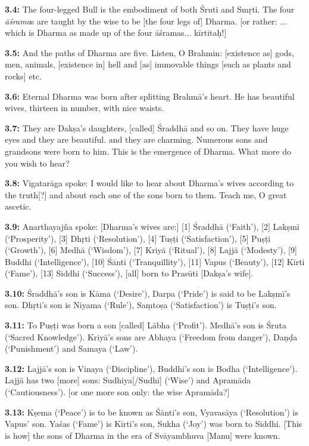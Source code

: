 \documentclass{article}
\newcommand{\vsnum}[1]{\textbf{#1}}
\newcommand{\skt}[1]{\textit{#1}}
\begin{document}
\vsnum{3.4: }The four-legged Bull is the embodiment of both Śruti and Smṛti. The four \skt{āśrama}s are taught by the wise to be [the four legs of] Dharma. [or rather: ... which is Dharma as made up of the four āśramas... kīrtitaḥ!]

\vsnum{3.5: }And the paths of Dharma are five. Listen, O Brahmin: [existence as] gods, men, animals, [existence in] hell and [as] immovable things [such as plants and rocks] etc.

\vsnum{3.6: }Eternal Dharma was born after splitting Brahmā's heart. He has beautiful wives, thirteen in number, with nice waists.

\vsnum{3.7: }They are Dakṣa's daughters, [called] Śraddhā and so on. They have huge eyes and they are beautiful. and they are charming. Numerous sons and grandsons were born to him. This is the emergence of Dharma. What more do you wish to hear?

\vsnum{3.8: }Vigatarāga spoke: I would like to hear about Dharma's wives according to the truth[?] and about each one of the sons born to them. Teach me, O great ascetic.

\vsnum{3.9: }Anarthayajña spoke: [Dharma's wives are:] [1] Śraddhā (`Faith'), [2] Lakṣmī (`Prosperity'), [3] Dhṛti (`Resolution'), [4] Tuṣṭi (`Satisfaction'), [5] Puṣṭi (`Growth'), [6] Medhā (`Wisdom'), [7] Kriyā (`Ritual'), [8] Lajjā (`Modesty'), [9] Buddhi (`Intelligence'), [10] Śānti (`Tranquillity'), [11] Vapus (`Beauty'), [12] Kīrti (`Fame'), [13] Siddhi (`Success'), [all] born to Prasūti [Dakṣa's wife].

\vsnum{3.10: }Śraddhā's son is Kāma (`Desire'), Darpa (`Pride') is said to be Lakṣmī's son. Dhṛti's son is Niyama (`Rule'), Saṃtoṣa (`Satisfaction') is Tuṣṭi's son.

\vsnum{3.11: }To Puṣṭi was born a son [called] Lābha (`Profit'). Medhā's son is Śruta (`Sacred Knowledge'). Kriyā's sons are Abhaya (`Freedom from danger'), Daṇḍa (`Punishment') and Samaya (`Law').

\vsnum{3.12: }Lajjā's son is Vinaya (`Discipline'), Buddhi's son is Bodha (`Intelligence'). Lajjā has two [more] sons: Sudhiya[/Sudhī] (`Wise') and Apramāda (`Cautiousness'). [or one more son only: the wise Apramāda?]

\vsnum{3.13: }Kṣema (`Peace') is to be known as Śānti's son, Vyavasāya (`Resolution') is Vapus' son. Yaśas (`Fame') is Kīrti's son, Sukha (`Joy') was born to Siddhi. [This is how] the sons of Dharma in the era of Svāyambhuva [Manu] were known.
\end{document}
